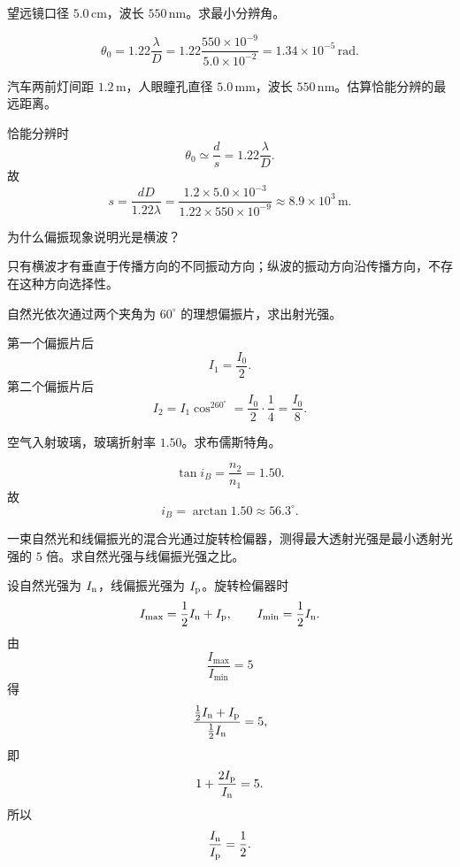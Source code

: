 \begin{exercise}[level=standard]
望远镜口径 $5.0\,\mathrm{cm}$，波长 $550\,\mathrm{nm}$。求最小分辨角。
\begin{solution}
\[
  \theta_0=1.22\frac{\lambda}{D}
  =1.22\frac{550\times10^{-9}}{5.0\times10^{-2}}
  =1.34\times10^{-5}\,\mathrm{rad}.
\]
\end{solution}
\end{exercise}

\begin{exercise}[level=standard]
汽车两前灯间距 $1.2\,\mathrm{m}$，人眼瞳孔直径 $5.0\,\mathrm{mm}$，波长 $550\,\mathrm{nm}$。估算恰能分辨的最远距离。
\begin{solution}
恰能分辨时
\[
  \theta_0\simeq\frac{d}{s}=1.22\frac{\lambda}{D}.
\]
故
\[
  s=\frac{dD}{1.22\lambda}
  =\frac{1.2\times5.0\times10^{-3}}{1.22\times550\times10^{-9}}
  \approx8.9\times10^3\,\mathrm{m}.
\]
\end{solution}
\end{exercise}

\begin{exercise}[level=basic]
为什么偏振现象说明光是横波？
\begin{solution}
只有横波才有垂直于传播方向的不同振动方向；纵波的振动方向沿传播方向，不存在这种方向选择性。
\end{solution}
\end{exercise}

\begin{exercise}[level=standard]
自然光依次通过两个夹角为 $60^\circ$ 的理想偏振片，求出射光强。
\begin{solution}
第一个偏振片后
\[
  I_1=\frac{I_0}{2}.
\]
第二个偏振片后
\[
  I_2=I_1\cos^260^\circ=\frac{I_0}{2}\cdot\frac14=\frac{I_0}{8}.
\]
\end{solution}
\end{exercise}

\begin{exercise}[level=standard]
空气入射玻璃，玻璃折射率 $1.50$。求布儒斯特角。
\begin{solution}
\[
  \tan i_B=\frac{n_2}{n_1}=1.50.
\]
故
\[
  i_B=\arctan1.50\approx56.3^\circ.
\]
\end{solution}
\end{exercise}

\begin{exercise}[level=standard]
一束自然光和线偏振光的混合光通过旋转检偏器，测得最大透射光强是最小透射光强的 $5$ 倍。求自然光强与线偏振光强之比。
\begin{solution}
设自然光强为 $I_{\rm n}$，线偏振光强为 $I_{\rm p}$。旋转检偏器时
\[
  I_{\max}=\frac12 I_{\rm n}+I_{\rm p},\qquad
  I_{\min}=\frac12 I_{\rm n}.
\]
由
\[
  \frac{I_{\max}}{I_{\min}}=5
\]
得
\[
  \frac{\frac12 I_{\rm n}+I_{\rm p}}{\frac12 I_{\rm n}}=5,
\]
即
\[
  1+\frac{2I_{\rm p}}{I_{\rm n}}=5.
\]
所以
\[
  \frac{I_{\rm n}}{I_{\rm p}}=\frac12.
\]
\end{solution}
\end{exercise}


